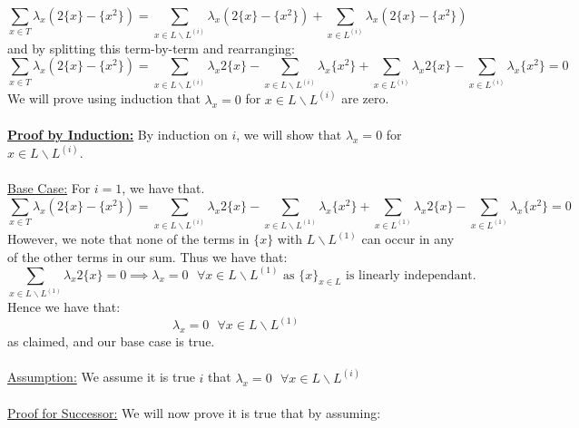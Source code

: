 \documentclass[11pt]{article}
\theoremstyle{plain}
\theoremstyle{definition}
\begin{document}
\\
\begin{equation*}
\sum_{x \in T} \lambda_x (2\{x\} - \{x^2\}) = \sum_{x \in L\backslash L^{(i)}} \lambda_x (2\{x\} - \{x^2\}) + \sum_{x  \in L^{(i)}} \lambda_x (2\{x\} - \{x^2\})
\end{equation*}
and by splitting this term-by-term and rearranging:
\begin{equation*}
\sum_{x \in T} \lambda_x (2\{x\} - \{x^2\}) = \sum_{x \in L\backslash L^{(i)}} \lambda_x 2\{x\} - \sum_{x \in L\backslash L^{(i)}} \lambda_x  \{x^2\} + \sum_{x \in L^{(i)}} \lambda_x 2\{x\} -  \sum_{x \in L^{(i)}} \lambda_x \{x^2\} = 0
\end{equation*}
 We will prove using induction that $\lambda_x = 0$ for $x \in L \backslash L^{(i)}$ are zero.\\
 \\
\textbf{\underline{Proof by Induction:}} By induction on $i$, we will show that $\lambda_x = 0$ for $x \in L \backslash L^(i)$.\\
\\
\underline{Base Case:} For $i = 1$, we have that. \\
\begin{equation*}
\sum_{x \in T} \lambda_x (2\{x\} - \{x^2\}) = \sum_{x \in L\backslash L^{(i)}} \lambda_x 2\{x\} - \sum_{x \in L\backslash L^{(1)}} \lambda_x  \{x^2\} + \sum_{ x \in L^{(1)}} \lambda_x 2\{x\} -  \sum_{x \in L^{(1)}} \lambda_x \{x^2\} = 0
\end{equation*}
However, we note that none of the terms in $\{x\}$ with $L\backslash L^{(1)}$ can occur in any of the other terms in our sum. Thus we have that:\\
\begin{equation*}
\sum_{x \in L\backslash L^{(1)}} \lambda_x 2\{x\}  = 0 \implies \lambda_x = 0 \text{ }\forall x \in L\backslash L^{(1)} \text{ as }\{x\}_{x \in L} \text{ is linearly independant.}
\end{equation*}
Hence we have that:
\begin{equation*}
 \lambda_x = 0 \text{ }\forall x \in L\backslash L^{(1)} 
\end{equation*}
as claimed, and our base case is true.\\
\\
\underline{Assumption:} We assume it is true $i$ that $\lambda_x = 0 \text{ }\forall x \in L\backslash L^{(i)}$ \\
\\
\underline{Proof for Successor:} We will now prove it is true that by assuming:
\end{document}
